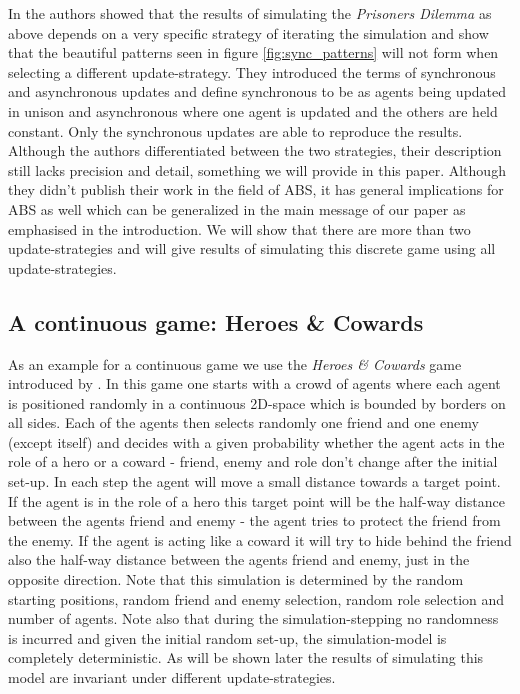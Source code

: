 In \cite{huberman_evolutionary_1993} the authors showed that the results of simulating the \textit{Prisoners Dilemma} as above depends on a very specific strategy of iterating the simulation and show that the beautiful patterns seen in figure \ref{fig:sync_patterns} will not form when selecting a different update-strategy. They introduced the terms of synchronous and asynchronous updates and define synchronous to be as agents being updated in unison and asynchronous where one agent is updated and the others are held constant. Only the synchronous updates are able to reproduce the results. Although the authors differentiated between the two strategies, their description still lacks precision and detail, something we will provide in this paper. Although they didn't publish their work in the field of ABS, it has general implications for ABS as well which can be generalized in the main message of our paper as emphasised in the introduction. We will show that there are more than two update-strategies and will give results of simulating this discrete game using all update-strategies.

\subsection{A continuous game: Heroes \& Cowards}
As an example for a continuous game we use the \textit{Heroes \& Cowards} game introduced by \cite{wilensky_introduction_2015}. In this game one starts with a crowd of agents where each agent is positioned randomly in a continuous 2D-space which is bounded by borders on all sides. Each of the agents then selects randomly one friend and one enemy (except itself) and decides with a given probability whether the agent acts in the role of a hero or a coward - friend, enemy and role don't change after the initial set-up. In each step the agent will move a small distance towards a target point. If the agent is in the role of a hero this target point will be the half-way distance between the agents friend and enemy - the agent tries to protect the friend from the enemy. If the agent is acting like a coward it will try to hide behind the friend also the half-way distance between the agents friend and enemy, just in the opposite direction. Note that this simulation is determined by the random starting positions, random friend and enemy selection, random role selection and number of agents. Note also that during the simulation-stepping no randomness is incurred and given the initial random set-up, the simulation-model is completely deterministic. As will be shown later the results of simulating this model are invariant under different update-strategies.

